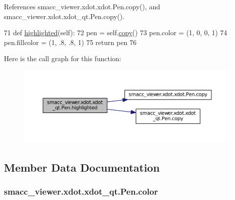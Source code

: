 References smacc\+\_\+viewer.\+xdot.\+xdot.\+Pen.\+copy(), and smacc\+\_\+viewer.\+xdot.\+xdot\+\_\+qt.\+Pen.\+copy().


\begin{DoxyCode}
71     \textcolor{keyword}{def }\hyperlink{classsmacc__viewer_1_1xdot_1_1xdot__qt_1_1Pen_a1a2abcb7f03ab955288e9268f86c8fd1}{highlighted}(self):
72         pen = self.\hyperlink{classsmacc__viewer_1_1xdot_1_1xdot__qt_1_1Pen_a4456b808ca309e759d3be54141d03dca}{copy}()
73         pen.color = (1, 0, 0, 1)
74         pen.fillcolor = (1, .8, .8, 1)
75         \textcolor{keywordflow}{return} pen
76 
\end{DoxyCode}


Here is the call graph for this function\+:
\nopagebreak
\begin{figure}[H]
\begin{center}
\leavevmode
\includegraphics[width=350pt]{classsmacc__viewer_1_1xdot_1_1xdot__qt_1_1Pen_a1a2abcb7f03ab955288e9268f86c8fd1_cgraph}
\end{center}
\end{figure}




\subsection{Member Data Documentation}
\subsubsection[{\texorpdfstring{color}{color}}]{\setlength{\rightskip}{0pt plus 5cm}smacc\+\_\+viewer.\+xdot.\+xdot\+\_\+qt.\+Pen.\+color}\hypertarget{classsmacc__viewer_1_1xdot_1_1xdot__qt_1_1Pen_a3fd5e3bcfb85c39f6841127d439135eb}{}\label{classsmacc__viewer_1_1xdot_1_1xdot__qt_1_1Pen_a3fd5e3bcfb85c39f6841127d439135eb}


